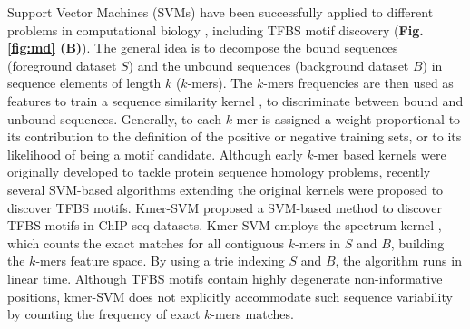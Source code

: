 \documentclass[a4paper, titlepage, openright]{book}
\begin{document}
Support Vector Machines (SVMs) \citep{boser1992training} have been successfully applied to different problems in computational biology \citep{ben2008support}, including TFBS motif discovery (\textbf{Fig.\ref{fig:md} (B)}). The general idea is to decompose the bound sequences (foreground dataset $S$) and the unbound sequences (background dataset $B$) in sequence elements of length $k$ ($k$-mers). The $k$-mers frequencies are then used as features to train a sequence similarity kernel \citep{ben2008support}, to discriminate between bound and unbound sequences. Generally, to each $k$-mer is assigned a weight proportional to its contribution to the definition of the positive or negative training sets, or to its likelihood of being a motif candidate. Although early $k$-mer based kernels \citep{leslie2001spectrum,eskin2002mismatch,kuang2005profile} were originally developed to tackle protein sequence homology problems, recently several SVM-based algorithms extending the original kernels were proposed to discover TFBS motifs. Kmer-SVM \citep{lee2011discriminative,fletez2013kmer} proposed a SVM-based method to discover TFBS motifs in ChIP-seq datasets. Kmer-SVM employs the spectrum kernel \citep{leslie2001spectrum}, which counts the exact matches for all contiguous $k$-mers in $S$ and $B$, building the $k$-mers feature space. By using a trie \citep{bodon2003trie} indexing $S$ and $B$, the algorithm runs in linear time. Although TFBS motifs contain highly degenerate non-informative positions, kmer-SVM does not explicitly accommodate such sequence variability by counting the frequency of exact $k$-mers matches. 
\end{document}
